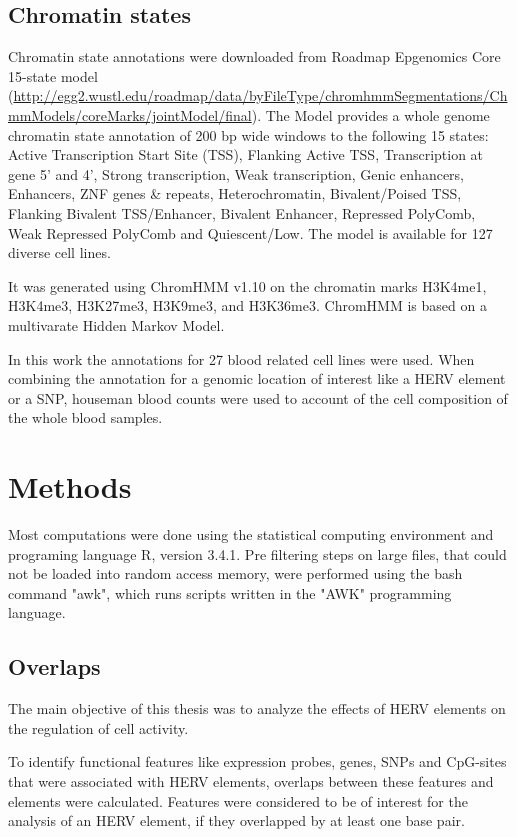 \documentclass[a4paper,12pt,twoside,openright]{report}
\begin{document}
\section{Chromatin states}
\label{Data:Chromatin states}
Chromatin state annotations were downloaded from Roadmap Epgenomics Core 15-state model (\url{http://egg2.wustl.edu/roadmap/data/byFileType/chromhmmSegmentations/ChmmModels/coreMarks/jointModel/final}). The Model provides a whole genome chromatin state annotation of 200 bp wide windows to the following 15 states: Active Transcription Start Site (TSS), Flanking Active TSS, Transcription at gene 5' and 4', Strong transcription, Weak transcription, Genic enhancers, Enhancers, ZNF genes \& repeats, Heterochromatin, Bivalent/Poised TSS, Flanking Bivalent TSS/Enhancer, Bivalent Enhancer, Repressed PolyComb, Weak Repressed PolyComb and Quiescent/Low. The model is available for 127 diverse cell lines. 

It was generated using ChromHMM v1.10\cite{10.1038/nmeth.1906} on the chromatin marks H3K4me1, H3K4me3, H3K27me3, H3K9me3, and H3K36me3. ChromHMM is based on a multivarate Hidden Markov Model. 

In this work the annotations for 27 blood related cell lines were used. When combining the annotation for a genomic location of interest like a HERV element or a SNP, houseman blood counts were used to account of the cell composition of the whole blood samples. 


\newpage
\chapter{Methods}
\label{Methods}
Most computations were done using the statistical computing environment and programing language R, version 3.4.1\cite{Rlanguage}. Pre filtering steps on large files, that could not be loaded into random access memory, were performed using the bash command "awk", which runs scripts written in the "AWK" programming language.

\section{Overlaps}
\label{Methods:Overlaps}
The main objective of this thesis was to analyze the effects of HERV elements on the regulation of cell activity. 

To identify functional features like expression probes, genes, SNPs and CpG-sites that were associated with HERV elements, overlaps between these features and elements were calculated. Features were considered to be of interest for the analysis of an HERV element, if they overlapped by at least one base pair.
\end{document}
